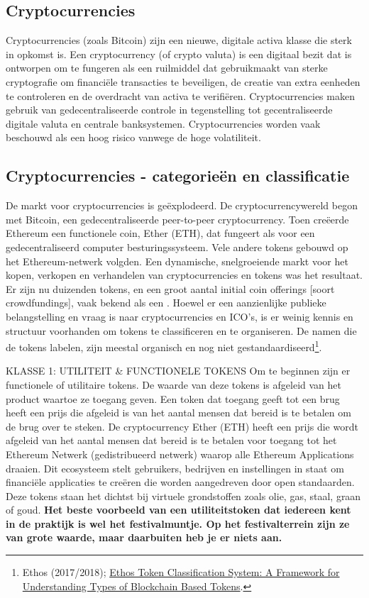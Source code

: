 \subsection{Cryptocurrencies}
Cryptocurrencies (zoals Bitcoin) zijn een nieuwe, digitale activa klasse die sterk in opkomst is. Een cryptocurrency (of crypto valuta) is een digitaal bezit dat is ontworpen om te fungeren als een ruilmiddel dat gebruikmaakt van sterke cryptografie om financi\"ele transacties te beveiligen, de creatie van extra eenheden te controleren en de overdracht van activa te verifi\"eren. Cryptocurrencies maken gebruik van gedecentraliseerde controle in tegenstelling tot gecentraliseerde digitale valuta en centrale banksystemen. Cryptocurrencies worden vaak beschouwd als een hoog risico vanwege de hoge volatiliteit.

\subsection{Cryptocurrencies - categorie\"en en classificatie}
De markt voor cryptocurrencies is ge\"explodeerd. De cryptocurrencywereld begon met Bitcoin, een gedecentraliseerde peer-to-peer cryptocurrency. Toen cre\"eerde Ethereum een functionele coin, Ether (ETH), dat fungeert als  voor een gedecentraliseerd computer besturingssysteem. Vele andere tokens gebouwd op het Ethereum-netwerk volgden. Een dynamische, snelgroeiende markt voor het kopen, verkopen en verhandelen van cryptocurrencies en tokens was het resultaat.
Er zijn nu duizenden tokens, en een groot aantal initial coin offerings [soort crowdfundings], vaak bekend als een . Hoewel er een aanzienlijke publieke belangstelling en vraag is naar cryptocurrencies en ICO's, is er weinig kennis en structuur voorhanden om tokens te classificeren en te organiseren. De namen die de tokens labelen, zijn meestal organisch en nog niet gestandaardiseerd\footnote{Ethos (2017/2018); \href{https://www.ethos.io/blockchain-finance/}{Ethos Token Classification System: A Framework for Understanding Types of Blockchain Based Tokens}.}. 

    \bigskip
    \begin{cryptobox}{KLASSE 1: UTILITEIT \& FUNCTIONELE TOKENS}
        Om te beginnen zijn er functionele of utilitaire tokens. De waarde van deze tokens is afgeleid van het product waartoe ze toegang geven. Een token dat toegang geeft tot een brug heeft een prijs die afgeleid is van het aantal mensen dat bereid is te betalen om de brug over te steken. De cryptocurrency Ether (ETH) heeft een prijs die wordt afgeleid van het aantal mensen dat bereid is te betalen voor toegang tot het Ethereum Netwerk (gedistribueerd netwerk) waarop alle Ethereum Applications draaien. Dit ecosysteem stelt gebruikers, bedrijven en instellingen in staat om financi\"ele applicaties te cre\"eren die worden aangedreven door open standaarden. Deze tokens staan het dichtst bij virtuele grondstoffen zoals olie, gas, staal, graan of goud.
        \tcblower
        \textbf{Het beste voorbeeld van een utiliteitstoken dat iedereen kent in de praktijk is wel het festivalmuntje. Op het festivalterrein zijn ze van grote waarde, maar daarbuiten heb je er niets aan.}
    \end{cryptobox}

